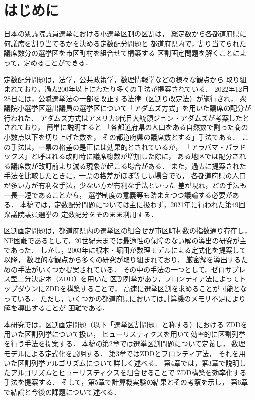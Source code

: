 \chapter{はじめに} \label{chapter:1}
日本の衆議院議員選挙における小選挙区制の区割は，
総定数から各都道府県に何議席を割り当てるかを決める定数配分問題と
都道府県内で，割り当てられた議席数分の選挙区を市区町村を組合せて構築する
区割画定問題を解くことによって，定めることができる．

定数配分問題は，法学，公共政策学，数理情報学などの様々な観点から
取り組まれており，過去200年以上にわたり多くの手法が提案されている．
2022年12月28日には，公職選挙法の一部を改正する法律（区割り改定法）が施行され，
衆議院小選挙区選出議員の選挙区について「アダムズ方式」を用いた議席の配分が行われた\cite{ichimori}．
アダムズ方式はアメリカ6代目大統領ジョン・アダムズが考案したとされており，
簡単に説明すると
「各都道府県の人口をある自然数で割った商の小数点以下を切り上げた数を，
その都道府県の議席数とする」手法である．
この手法は，一票の格差の是正には効果的とされているが，
「アラバマ・パラドックス」と呼ばれる改訂時に議席総数が増加した際に，
ある地区では配分される議席数が改訂前より減る現象が起こる場合がある．
また，過去に提案された手法を比較したときに，一票の格差がほぼ等しい場合でも，
各都道府県の人口が多い方が有利な手法，少ない方が有利な手法といった
差が現れ，どの手法も一長一短であることから，
選挙制度の意義等も踏まえつつ議論する必要がある．
本稿では，定数配分問題については主に扱わず，2021年に行われた第49回衆議院議員選挙の
定数配分をそのまま利用する．

区割画定問題は，都道府県内の選挙区の組合せが市区町村数の指数通り存在し，
NP困難であるとして，20世紀末までは最適性の保障のない解の導出の研究が主であった．
しかし，2003年に根本・堀田が数理モデルによる定式化を提案\cite{nemoto}して以降，
数理的な観点から多くの研究が取り組まれており，
厳密解を導出するための手法がいくつか提案されている．
その中の手法の一つとして，ゼロサプレス型二分決定木（ZDD）を用いた
区割列挙があり，フロンティア法によってトップダウンにZDDを構築することで，
高速に選挙区割を求めることが可能となっている．
ただし，いくつかの都道府県においては計算機のメモリ不足により解を導出することが
困難である．

本研究では，区割画定問題（以下「選挙区割問題」と称する）における
ZDDを用いた区割列挙について扱い，
ヒューリスティクスを用いて効率的に区割列挙を行う手法を提案する．
本稿の第2章では選挙区割問題について定義し，
数理モデルによる定式化を説明する．
第3章ではZDDとフロンティア法，
それを用いた区割列挙アルゴリズムについて詳しく述べる．
第4章では，第3章で説明したアルゴリズムとヒューリスティクスを組合せることで
ZDD構築を効率化する手法を提案する．
そして，第5章で計算機実験の結果とその考察を示し，
第6章で結論と今後の課題について述べる．

